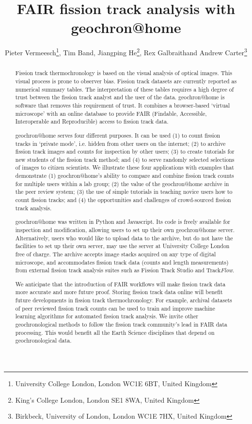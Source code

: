\documentclass{article}
\title{FAIR fission track analysis with geochron@home}
\author{Pieter Vermeesch\footnote[1]{University College London, London WC1E 6BT, United Kingdom},
  Tim Band\footnotemark[1],
  Jiangping He\footnote{King's College London, London SE1 8WA, United Kingdom},
  Rex Galbraith\footnotemark[1] and
  Andrew Carter\footnote{Birkbeck, University of London, London WC1E 7HX, United Kingdom}
}
\begin{document}
\maketitle

\begin{abstract}
Fission track thermochronology is based on the visual analysis of
optical images. This visual process is prone to observer bias. Fission
track datasets are currently reported as numerical summary tables. The
interpretation of these tables requires a high degree of trust between
the fission track analyst and the user of the data. geochron@home is
software that removes this requirement of trust. It combines a
browser-based `virtual microscope' with an online database to provide
FAIR (Findable, Accessible, Interoperable and Reproducible) access to
fission track data.\medskip

geochron@home serves four different purposes. It can be used (1) to
count fission tracks in `private mode', i.e. hidden from other users
on the internet; (2) to archive fission track images and counts for
inspection by other users; (3) to create tutorials for new students of
the fission track method; and (4) to serve randomly selected
selections of images to citizen scientists. We illustrate these four
applications with examples that demonstrate (1) geochron@home's
ability to compare and combine fission track counts for multiple users
within a lab group; (2) the value of the geochron@home archive in the
peer review system; (3) the use of simple tutorials in teaching novice
users how to count fission tracks; and (4) the opportunities and
challenges of crowd-sourced fission track analysis.\medskip

geochron@home was written in Python and Javascript. Its code is freely
available for inspection and modification, allowing users to set up
their own geochron@home server. Alternatively, users who would like to
upload data to the archive, but do not have the facilities to set up
their own server, may use the server at University College London free
of charge. The archive accepts image stacks acquired on any type of
digital microscope, and accommodates fission track data (counts and
length measurements) from external fission track analysis suites such
as Fission Track Studio and Track\emph{Flow}.\medskip

We anticipate that the introduction of FAIR workflows will make
fission track data more accurate and more future proof. Storing
fission track data online will benefit future developments in fission
track thermochronology. For example, archival datasets of peer
reviewed fission track counts can be used to train and improve machine
learning algorithms for automated fission track analysis. We invite
other geochronological methods to follow the fission track community's
lead in FAIR data processing. This would benefit all the Earth Science
disciplines that depend on geochronological data.
\end{abstract}
\end{document}
